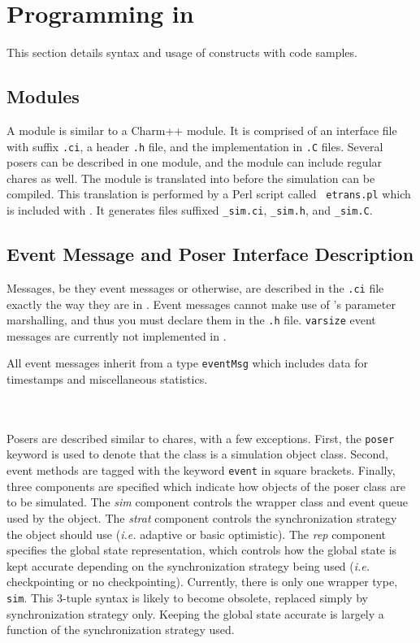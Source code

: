 \section{Programming in \pose{}}

This section details syntax and usage of \pose{} constructs with code samples.

\subsection{\pose{} Modules}

A \pose{} module is similar to a Charm++ module.  It is comprised of
an interface file with suffix {\tt .ci}, a header {\tt .h} file, and
the implementation in {\tt .C} files.  Several posers can be described
in one module, and the module can include regular chares as well.  The
module is translated into \charmpp{} before the simulation can be
compiled.  This translation is performed by a Perl script called {\tt
etrans.pl} which is included with \pose{}.  It generates files
suffixed {\tt \_sim.ci}, {\tt \_sim.h}, and {\tt \_sim.C}.

\subsection{Event Message and Poser Interface Description}

Messages, be they event messages or otherwise, are described in the
{\tt .ci} file exactly the way they are in \charmpp{}. Event messages
cannot make use of \charmpp{}'s parameter marshalling, and thus you
must declare them in the {\tt .h} file.  \charmpp{} {\tt varsize}
event messages are currently not implemented in \pose{}.

All event messages inherit from a \pose{} type {\tt eventMsg} which
includes data for timestamps and miscellaneous \pose{} statistics.

~\\
\\

Posers are described similar to chares, with a few exceptions.  First,
the {\tt poser} keyword is used to denote that the class is a \pose{}
simulation object class.  Second, event methods are tagged with the
keyword {\tt event} in square brackets. Finally, three components are
specified which indicate how objects of the poser class are to be
simulated.  The {\it sim} component controls the wrapper class and
event queue used by the object.  The {\it strat} component controls
the synchronization strategy the object should use ({\it i.e.}
adaptive or basic optimistic).  The {\it rep} component specifies the
global state representation, which controls how the global state is
kept accurate depending on the synchronization strategy being used
({\it i.e.} checkpointing or no checkpointing).  Currently, there is
only one wrapper type, {\tt sim}.  This 3-tuple syntax is likely to
become obsolete, replaced simply by synchronization strategy only.
Keeping the global state accurate is largely a function of the
synchronization strategy used.  

